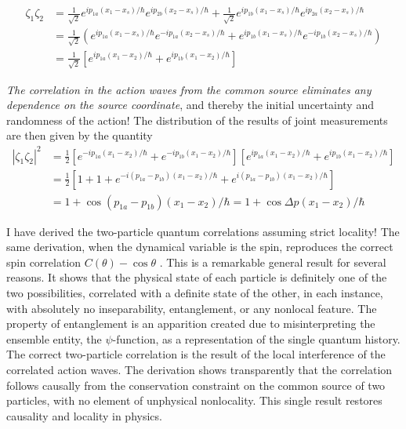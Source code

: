 \begin{align*}
\zeta_1 \zeta_2 & = \frac{1}{\sqrt{2}} e^{ip_{1a} (x_1- x_s) /\hbar} e^{ip_{2b} (x_2 -x_s) /\hbar} + \frac{1}{\sqrt{2}} e^{ip_{1b} (x_1 - x_s) /\hbar} e^{ip_{2a} (x_2 - x_s) /\hbar}\\
& = \frac{1}{\sqrt{2}}  \left(e^{ip_{1a} (x_1- x_s) /\hbar} e^{-ip_{1a} (x_2 -x_s) /\hbar} + e^{ip_{1b} (x_1 - x_s) /\hbar} e^{-ip_{1b} (x_2 - x_s) /\hbar} \right)\\
& = \frac{1}{\sqrt{2}} \left[ e^{ip_{1a} (x_1- x_2) / \hbar} + e^{ip_{1b} (x_1 -x_2) /\hbar}  \right]\tag{37}\label{c14-eq37}
\end{align*}

\textit{The correlation in the action waves from the common source eliminates any dependence on
the source coordinate}, and thereby the initial uncertainty and randomness of the action! The
distribution of the results of joint measurements are then given by the quantity
\begin{align*}
|\zeta_1 \zeta_2|^2 & = \frac{1}{2} \left[e^{-ip_{1a} (x_1 -x_2)/\hbar} + e^{-ip_{1b} (x_1-x_2)/\hbar} \right] \left[e^{ip_{1a} (x_1 -x_2) /\hbar} + e^{ip_{1b} (x_1 - x_2)/\hbar} \right] \\
& = \frac{1}{2} \left[1+1+e^{-i(p_{1a} - p_{1b}) (x_1-x_2)/\hbar } + e^{i(p_{1a} -p_{1b}) (x_1-x_2)/\hbar} \right]\\
& = 1 + \cos (p_{1a} - p_{1b}) (x_1 -x_2) / \hbar = 1 + \cos \Delta p (x_1-x_2) / \hbar\tag{38}\label{c14-eq38}
\end{align*}


I have derived the two-particle quantum correlations assuming strict locality! The same
derivation, when the dynamical variable is the spin, reproduces the correct spin correlation
$C(\theta) - \cos \theta$ \cite{chap14-key2}. This is a remarkable general result for several reasons. It shows that
the physical state of each particle is definitely one of the two possibilities, correlated with
a definite state of the other, in each instance, with absolutely no inseparability, entanglement, or any nonlocal feature. The property of entanglement is an apparition created due to misinterpreting the ensemble entity, the $\psi$-function, as a representation of the single quantum history. The correct two-particle correlation is the result of the local interference of the correlated action waves. The derivation shows transparently that the correlation follows causally from the conservation constraint on the common source of two particles, with no element of unphysical nonlocality. This single result restores causality and locality in
physics.

